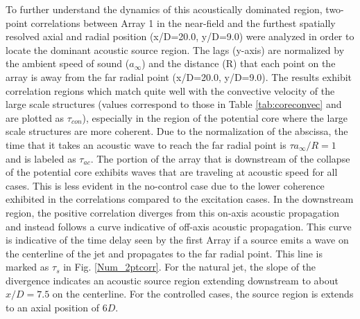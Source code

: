 \documentclass[english]{aiaa-tc}
\begin{document}
To further understand the dynamics of this acoustically dominated region, two-point correlations between Array 1 in the near-field and the furthest spatially resolved axial and radial position (x/D=20.0, y/D=9.0) were analyzed in order to locate the dominant acoustic source region. 
The lags (y-axis) are normalized by the ambient speed of sound ($a_{\infty}$) and the distance (R) that each point on the array is away from the far radial point (x/D=20.0, y/D=9.0).
The results exhibit correlation regions which match quite well with the convective velocity of the large scale structures (values correspond to those in Table \ref{tab:coreconvec} and are plotted as $\tau_{con}$), especially in the region of the potential core where the large scale structures are more coherent.
Due to the normalization of the abscissa, the time that it takes an acoustic wave to reach the far radial point is $\tau a_{\infty}/R=1$ and is labeled as $\tau_{ac}$. The portion of the array that is downstream of the collapse of the potential core exhibits waves that are traveling at acoustic speed for all cases. This is less evident in the no-control case due to the lower coherence exhibited in the correlations compared to the excitation cases.
In the downstream region, the positive correlation diverges from this on-axis acoustic propagation and instead follows a curve indicative of off-axis acoustic propagation. This curve is indicative of the time delay seen by the first Array if a source emits a wave on the centerline of the jet and propagates to the far radial point. This line is marked as $\tau_{s}$ in Fig. \ref{Num_2ptcorr}.
For the natural jet, the slope of the divergence indicates an acoustic source region extending downstream to about $x/D=7.5$ on the centerline. For the controlled cases, the source region is extends to an axial position of $6D$.
\end{document}
